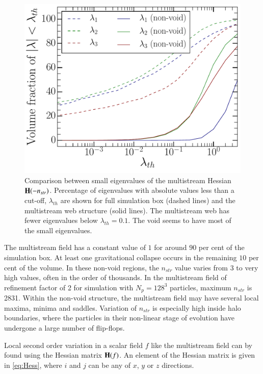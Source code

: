 \begin{figure}
\begin{minipage}[t]{.99\linewidth}
  \centering\includegraphics[width=10.cm]{Chapter4/Source_v2/fig7.pdf} 

\end{minipage}\hfill
\caption{Comparison between small eigenvalues of the multistream Hessian ${\bf H}(-n_{str})$. Percentage of eigenvalues with absolute values less than a cut-off, $\lambda_{th}$ are shown for full simulation box (dashed lines) and the multistream web structure (solid lines). The multistream web has fewer eigenvalues below $\lambda_{th} = 0.1$. The void seems to have most of the small eigenvalues. } 
\label{fig:lambdasSmall}
\end{figure}


The multistream field has a constant value of $1$ for around $90$ per cent of the simulation box. At least one gravitational collapse occurs in the remaining $10$ per cent of the volume. In these non-void regions, the $n_{str}$ value varies from 3 to very high values, often in the order of thousands. In the multistream field of refinement factor of 2 for simulation with $N_p = 128^3$ particles, maximum $n_{str}$ is 2831. Within the non-void structure, the multistream field may have several local maxima, minima and saddles. Variation of $n_{str}$ is especially high inside halo boundaries, where the particles in their non-linear stage of evolution have undergone a large number of flip-flops.  

Local second order variation in a scalar field $f$ like the multistream field can by found using the Hessian matrix ${\bf H}(f)$. An element of the Hessian matrix is given in \autoref{eq:Hess}, where $i$ and $j$ can be any of $x$, $y$ or $z$ directions.  

